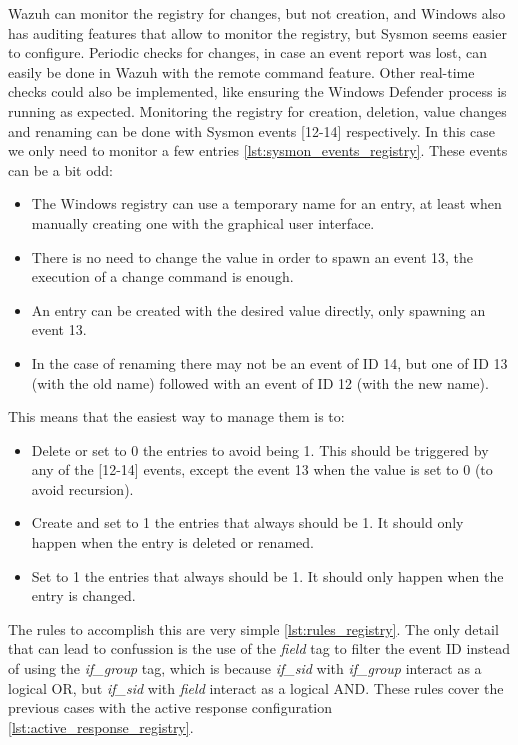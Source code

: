 \linej
Wazuh can monitor the registry for changes, but not creation, and Windows also has auditing features that allow to monitor the registry, but Sysmon seems easier to configure.
Periodic checks for changes, in case an event report was lost, can easily be done in Wazuh with the remote command feature.
Other real-time checks could also be implemented, like ensuring the Windows Defender process is running as expected.
\linej
Monitoring the registry for creation, deletion, value changes and renaming can be done with Sysmon events [12-14] respectively.
In this case we only need to monitor a few entries \ref{lst:sysmon_events_registry}.
These events can be a bit odd:
\begin{itemize}
	\item The Windows registry can use a temporary name for an entry, at least when manually creating one with the graphical user interface.
	\item There is no need to change the value in order to spawn an event 13, the execution of a change command is enough.
	\item An entry can be created with the desired value directly, only spawning an event 13.
	\item In the case of renaming there may not be an event of ID 14, but one of ID 13 (with the old name) followed with an event of ID 12 (with the new name).
\end{itemize}
\linej
This means that the easiest way to manage them is to:
\begin{itemize}
	\item Delete or set to 0 the entries to avoid being 1. This should be triggered by any of the [12-14] events, except the event 13 when the value is set to 0 (to avoid recursion).
	\item Create and set to 1 the entries that always should be 1. It should only happen when the entry is deleted or renamed.
	\item Set to 1 the entries that always should be 1. It should only happen when the entry is changed.
\end{itemize}
\linej
The rules to accomplish this are very simple \ref{lst:rules_registry}.
The only detail that can lead to confussion is the use of the \textit{field} tag to filter the event ID instead of using the \textit{if\_group} tag, which is because \textit{if\_sid} with \textit{if\_group} interact as a logical OR, but \textit{if\_sid} with \textit{field} interact as a logical AND.
\linej
These rules cover the previous cases with the active response configuration \ref{lst:active_response_registry}.
